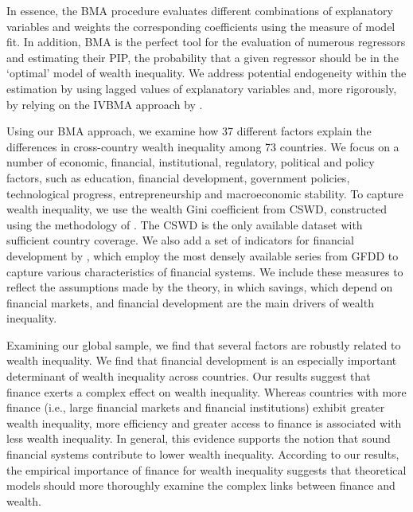 \documentclass[a4paper,11pt]{article}
\begin{document}
In essence, the \ac{BMA} procedure evaluates different combinations of explanatory variables and weights the corresponding coefficients using the measure of model fit. In addition, \ac{BMA} is the perfect tool for the evaluation of numerous regressors and estimating their \ac{PIP}, the probability that a given regressor should be in the `optimal' model of wealth inequality. We address potential endogeneity within the estimation by using lagged values of explanatory variables and, more rigorously, by relying on the \ac{IVBMA} approach by \citet{KarlLenkoski2012}.

Using our \ac{BMA} approach, we examine how 37 different factors explain the differences in cross-country wealth inequality among 73 countries. We focus on a number of economic, financial, institutional, regulatory, political and policy factors, such as education, financial development, government policies, technological progress, entrepreneurship and macroeconomic stability. To capture wealth inequality, we use the wealth Gini coefficient from \ac{CSWD}, constructed using the methodology of \citet{daviesetal2017}. The \ac{CSWD} is the only available dataset with sufficient country coverage. We also add a set of indicators for financial development by \citet{svirydzenka2016introducing}, which employ the most densely available series from \ac{GFDD} to capture various characteristics of financial systems. We include these measures to reflect the assumptions made by the theory, in which savings, which depend on financial markets, and financial development are the main drivers of wealth inequality.

Examining our global sample, we find that several factors are robustly related to wealth inequality. We find that financial development is an especially important determinant of wealth inequality across countries. Our results suggest that finance exerts a complex effect on wealth inequality. Whereas countries with more finance (i.e., large financial markets and financial institutions) exhibit greater wealth inequality, more efficiency and greater access to finance is associated with less wealth inequality. In general, this evidence supports the notion that sound financial systems contribute to lower wealth inequality. According to our results, the empirical importance of finance for wealth inequality suggests that theoretical models should more thoroughly examine the complex links between finance and wealth.
\end{document}
